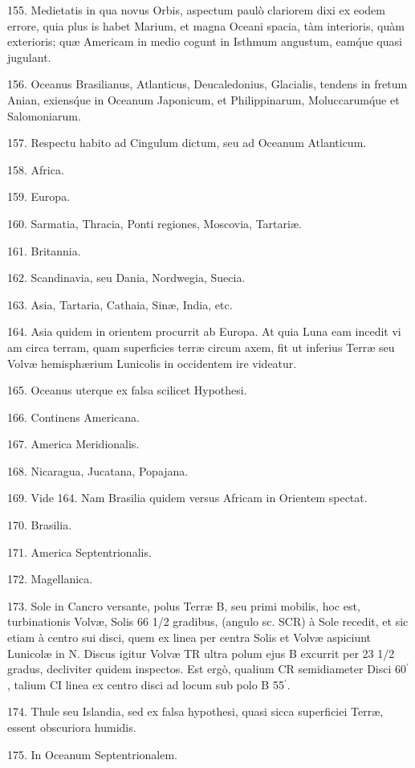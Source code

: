 \documentclass[a4paper, 11pt, oneside, polutonikogreek, german]{article}
\begin{document}
155. Medietatis in qua novus Orbis, aspectum paulò clariorem dixi ex eodem errore, quia plus is habet Marium, et magna Oceani spacia, tàm interioris, quàm exterioris; quæ Americam in medio cogunt in Isthmum angustum, eam\'que quasi jugulant.

156. Oceanus Brasilianus, Atlanticus, Deucaledonius, Glacialis, tendens in fretum Anian, exiens\'que in Oceanum Japonicum, et Philippinarum, Moluccarum\'que et Salomoniarum.

157. Respectu habito ad Cingulum dictum, seu ad Oceanum Atlanticum.

158. Africa.

159. Europa.

160. Sarmatia, Thracia, Ponti regiones, Moscovia, Tartariæ.

161. Britannia.

162. Scandinavia, seu Dania, Nordwegia, Suecia.

163. Asia, Tartaria, Cathaia, Sinæ, India, etc.

164. Asia quidem in orientem procurrit ab Europa. At quia Luna eam incedit vi am circa terram, quam superficies terræ circum axem, fit ut inferius Terræ seu Volvæ hemisphærium Lunicolis in occidentem ire videatur.

165. Oceanus uterque ex falsa scilicet Hypothesi.

166. Continens Americana.

167. America Meridionalis.

168. Nicaragua, Jucatana, Popajana.

169. Vide 164. Nam Brasilia quidem versus Africam in Orientem spectat.

170. Brasilia.

171. America Septentrionalis.

172. Magellanica.

173. Sole in Cancro versante, polus Terræ B, seu primi mobilis, hoc est, turbinationis Volvæ, Solis 66 1/2 gradibus, (angulo sc. SCR) à Sole recedit, et sic etiam à centro sui disci, quem ex linea per centra Solis et Volvæ aspiciunt Lunicolæ in N. Discus igitur Volvæ TR ultra polum ejus B excurrit per 23 1/2 gradus, decliviter quidem inspectos. Est ergò, qualium CR semidiameter Disci 60$^{\prime}$, talium CI linea ex centro disci ad locum sub polo B 55$^{\prime}$.

174. Thule seu Islandia, sed ex falsa hypothesi, quasi sicca superficiei Terræ, essent obscuriora humidis.

175. In Oceanum Septentrionalem.
\end{document}
